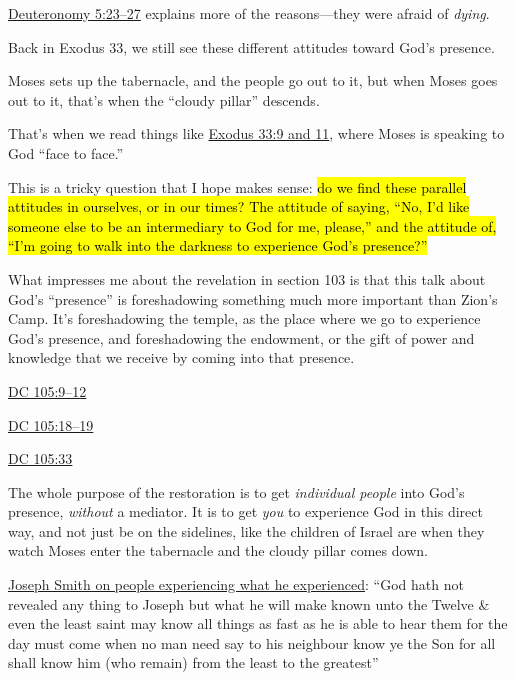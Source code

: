 \begin{compactitem}
\begin{compactitem}
\begin{compactitem}
\begin{compactitem}
									\item \hyperref[DEUTERONOMY-5-23]{Deuteronomy 5:23--27} explains more of the reasons---they were afraid of \textit{dying}.
									\item Back in Exodus 33, we still see these different attitudes toward God's presence.
									\item Moses sets up the tabernacle, and the people go out to it, but when Moses goes out to it, that's when the ``cloudy pillar'' descends.
									\item That's when we read things like \hyperref[EXODUS-33-9]{Exodus 33:9 and 11}, where Moses is speaking to God ``face to face.''
									\item This is a tricky question that I hope makes sense: \hl{do we find these parallel attitudes in ourselves, or in our times? The attitude of saying, ``No, I'd like someone else to be an intermediary to God for me, please,'' and the attitude of, ``I'm going to walk into the darkness to experience God's presence?''}
								\end{compactitem}
							\item What impresses me about the revelation in section 103 is that this talk about God's ``presence'' is foreshadowing something much more important than Zion's Camp. It's foreshadowing the temple, as the place where we go to experience God's presence, and foreshadowing the endowment, or the gift of power and knowledge that we receive by coming into that presence.
								\begin{compactitem}
									\item \hyperref[DC105-9]{DC 105:9--12}
									\item \hyperref[DC105-18]{DC 105:18--19}
									\item \hyperref[DC105-33]{DC 105:33}
									\item The whole purpose of the restoration is to get \textit{individual people} into God's presence, \textit{without} a mediator. It is to get \textit{you} to experience God in this direct way, and not just be on the sidelines, like the children of Israel are when they watch Moses enter the tabernacle and the cloudy pillar comes down.
									\item \hyperlink{EMS-1839-JS-CIR-26-JUN-CIR-2-JUL-1839-WW-c}{Joseph Smith on people experiencing what he experienced}: ``God hath not revealed any thing to Joseph but what he will make known unto the Twelve \& even the least saint may know all things as fast as he is able to hear them for the day must come when no man need say to his neighbour know ye the Son for all shall know him (who remain) from the least to the greatest''

\end{compactitem}
\end{compactitem}
\end{compactitem}
\end{compactitem}
